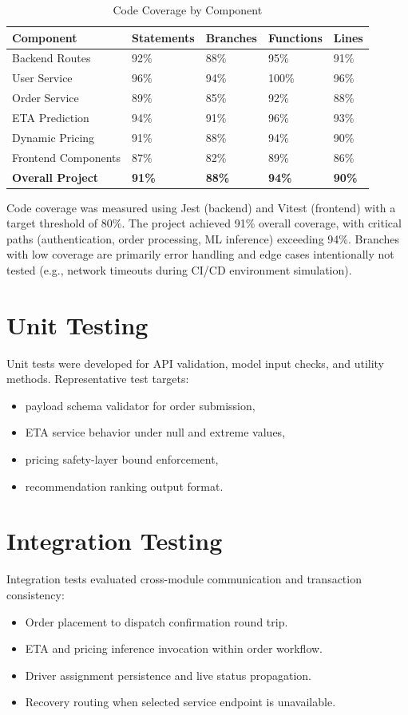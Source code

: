 \documentclass[12pt,a4paper]{report}
\begin{document}
\begin{itemize}
\begin{table}[H]
\centering
\caption{Code Coverage by Component}
\begin{tabular}{p{3.5cm} p{1.5cm} p{1.5cm} p{1.5cm} p{1.5cm}}
\toprule
\textbf{Component} & \textbf{Statements} & \textbf{Branches} & \textbf{Functions} & \textbf{Lines} \\
\midrule
Backend Routes & 92\% & 88\% & 95\% & 91\% \\
User Service & 96\% & 94\% & 100\% & 96\% \\
Order Service & 89\% & 85\% & 92\% & 88\% \\
ETA Prediction & 94\% & 91\% & 96\% & 93\% \\
Dynamic Pricing & 91\% & 88\% & 94\% & 90\% \\
Frontend Components & 87\% & 82\% & 89\% & 86\% \\
\textbf{Overall Project} & \textbf{91\%} & \textbf{88\%} & \textbf{94\%} & \textbf{90\%} \\
\bottomrule
\end{tabular}
\end{table}

Code coverage was measured using Jest (backend) and Vitest (frontend) with a target threshold of 80\%. The project achieved 91\% overall coverage, with critical paths (authentication, order processing, ML inference) exceeding 94\%. Branches with low coverage are primarily error handling and edge cases intentionally not tested (e.g., network timeouts during CI/CD environment simulation).

\section{Unit Testing}
Unit tests were developed for API validation, model input checks, and utility methods. Representative test targets:
\begin{itemize}
\item payload schema validator for order submission,
\item ETA service behavior under null and extreme values,
\item pricing safety-layer bound enforcement,
\item recommendation ranking output format.
\end{itemize}

\section{Integration Testing}
Integration tests evaluated cross-module communication and transaction consistency:
\begin{itemize}
\item Order placement to dispatch confirmation round trip.
\item ETA and pricing inference invocation within order workflow.
\item Driver assignment persistence and live status propagation.
\item Recovery routing when selected service endpoint is unavailable.
\end{itemize}


\end{itemize}
\end{document}
